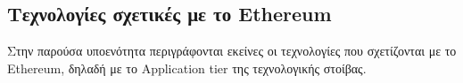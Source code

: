 \subsection{Τεχνολογίες σχετικές με το Ethereum} \label{subsection:4-2-3-ethereum-technologies}

Στην παρούσα υποενότητα περιγράφονται εκείνες οι τεχνολογίες που σχετίζονται με το Ethereum, δηλαδή με το Application tier της τεχνολογικής στοίβας.



